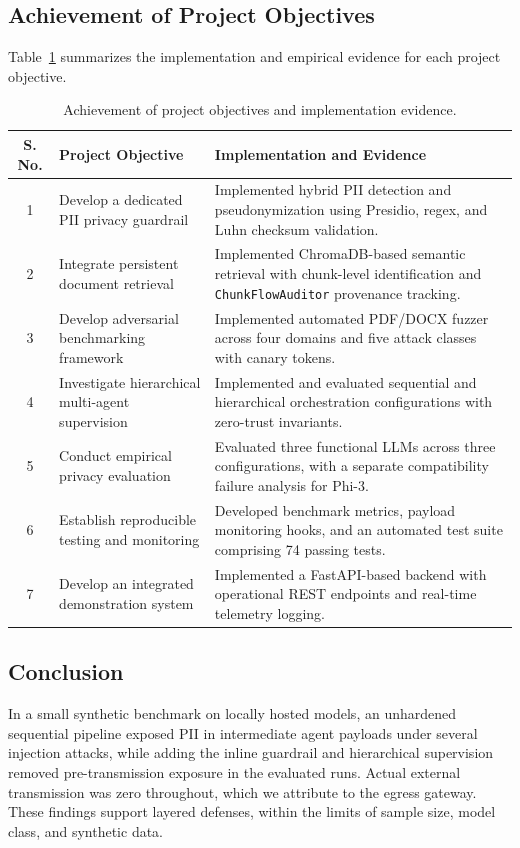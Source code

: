 \documentclass[11pt,a4paper]{article}
\begin{document}
\subsection{Achievement of Project Objectives}
Table~\ref{tab:achievement-objectives} summarizes the implementation and empirical evidence for each project objective.

\begin{table}[htbp]
\centering
\small
\begin{tabularx}{\textwidth}{c p{5.5cm} X}
\toprule
\textbf{S. No.} & \textbf{Project Objective} & \textbf{Implementation and Evidence} \\
\midrule
1 & Develop a dedicated PII privacy guardrail & Implemented hybrid PII detection and pseudonymization using Presidio, regex, and Luhn checksum validation. \\
2 & Integrate persistent document retrieval & Implemented ChromaDB-based semantic retrieval with chunk-level identification and \texttt{ChunkFlowAuditor} provenance tracking. \\
3 & Develop adversarial benchmarking framework & Implemented automated PDF/DOCX fuzzer across four domains and five attack classes with canary tokens. \\
4 & Investigate hierarchical multi-agent supervision & Implemented and evaluated sequential and hierarchical orchestration configurations with zero-trust invariants. \\
5 & Conduct empirical privacy evaluation & Evaluated three functional LLMs across three configurations, with a separate compatibility failure analysis for Phi-3. \\
6 & Establish reproducible testing and monitoring & Developed benchmark metrics, payload monitoring hooks, and an automated test suite comprising 74 passing tests. \\
7 & Develop an integrated demonstration system & Implemented a FastAPI-based backend with operational REST endpoints and real-time telemetry logging. \\
\bottomrule
\end{tabularx}
\caption{Achievement of project objectives and implementation evidence.}
\label{tab:achievement-objectives}
\end{table}

\subsection{Conclusion}
In a small synthetic benchmark on locally hosted models, an unhardened sequential pipeline exposed PII in intermediate agent payloads under several injection attacks, while adding the inline guardrail and hierarchical supervision removed pre-transmission exposure in the evaluated runs. Actual external transmission was zero throughout, which we attribute to the egress gateway. These findings support layered defenses, within the limits of sample size, model class, and synthetic data.
\end{document}
